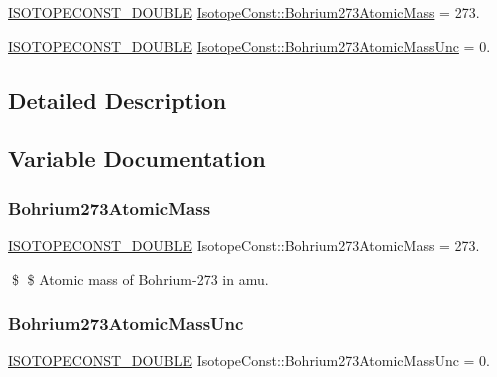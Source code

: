 \begin{DoxyCompactItemize}
\item 
\mbox{\hyperlink{group___isotope_const-_macros_ga8f45a7272ce02c0b4c65c44636ed719a}{I\+S\+O\+T\+O\+P\+E\+C\+O\+N\+S\+T\+\_\+\+D\+O\+U\+B\+LE}} \mbox{\hyperlink{group___isotope_const-_bohrium-_bh273_gaa9e8a19b48e28873e412524809e67559}{Isotope\+Const\+::\+Bohrium273\+Atomic\+Mass}} = 273.
\item 
\mbox{\hyperlink{group___isotope_const-_macros_ga8f45a7272ce02c0b4c65c44636ed719a}{I\+S\+O\+T\+O\+P\+E\+C\+O\+N\+S\+T\+\_\+\+D\+O\+U\+B\+LE}} \mbox{\hyperlink{group___isotope_const-_bohrium-_bh273_gacb94d3a521cfcfd6bea28f29c4929365}{Isotope\+Const\+::\+Bohrium273\+Atomic\+Mass\+Unc}} = 0.
\end{DoxyCompactItemize}


\subsection{Detailed Description}


\subsection{Variable Documentation}
\mbox{\label{group___isotope_const-_bohrium-_bh273_gaa9e8a19b48e28873e412524809e67559}} 
\subsubsection{\texorpdfstring{Bohrium273\+Atomic\+Mass}{Bohrium273AtomicMass}}
{\footnotesize\ttfamily \mbox{\hyperlink{group___isotope_const-_macros_ga8f45a7272ce02c0b4c65c44636ed719a}{I\+S\+O\+T\+O\+P\+E\+C\+O\+N\+S\+T\+\_\+\+D\+O\+U\+B\+LE}} Isotope\+Const\+::\+Bohrium273\+Atomic\+Mass = 273.}

\$ \$ Atomic mass of Bohrium-\/273 in amu. \mbox{\label{group___isotope_const-_bohrium-_bh273_gacb94d3a521cfcfd6bea28f29c4929365}} 
\subsubsection{\texorpdfstring{Bohrium273\+Atomic\+Mass\+Unc}{Bohrium273AtomicMassUnc}}
{\footnotesize\ttfamily \mbox{\hyperlink{group___isotope_const-_macros_ga8f45a7272ce02c0b4c65c44636ed719a}{I\+S\+O\+T\+O\+P\+E\+C\+O\+N\+S\+T\+\_\+\+D\+O\+U\+B\+LE}} Isotope\+Const\+::\+Bohrium273\+Atomic\+Mass\+Unc = 0.}

